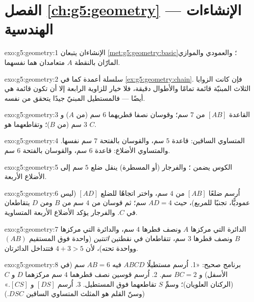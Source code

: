 \section*{الفصل \ref{ch:g5:geometry} --- الإنشاءات الهندسية}

\begin{solution}{exo:g5:geometry:1}
الإنشاءان يتبعان \cref{met:g5:geometry:basic}؛ والعمودي
والموازي المارّان بالنقطة $A$ متعامدان هما
نفسهما.
\end{solution}

\begin{solution}{exo:g5:geometry:2}
سلسلة أعمدة كما في \cref{ex:g5:geometry:chain}. فإن كانت
الزوايا الثلاث المبنيّة قائمة تمامًا والأطوال دقيقة، فلا
خيار للزاوية الرابعة إلا أن تكون قائمة هي أيضًا --- فالمستطيل
المبنيّ جيدًا يتحقق من نفسه.
\end{solution}

\begin{solution}{exo:g5:geometry:3}
القاعدة $[AB]$ من $7$ سم؛ وقوسان نصفا قطريهما $6$ سم (من $A$) و $3$ سم
(من $B$)؛ وتقاطعهما هو $C$.
\end{solution}

\begin{solution}{exo:g5:geometry:4}
المتساوي الساقين: قاعدة $5$ سم، والقوسان بالفتحة $7$ سم نفسها.
والمتساوي الأضلاع: قاعدة $6$ سم، والقوسان بالفتحة $6$ سم.
\end{solution}

\begin{solution}{exo:g5:geometry:5}
الكوس يضمن ؛ والفرجار (أو
المسطرة) ينقل ضلع $5$ سم إلى الأضلاع الأربعة.
\end{solution}

\begin{solution}{exo:g5:geometry:6}
اُرسم ضلعًا $[AB]$ من $4$ سم، واختر اتجاهًا للضلع $[AD]$ (ليس
عموديًّا، تجنبًا للمربع)، حيث $AD = 4$ سم؛ ثم قوسان من
$4$ سم من $B$ ومن $D$ يتقاطعان في $C$. والفرجار يؤكد
الأضلاع الأربعة المتساوية.
\end{solution}

\begin{solution}{exo:g5:geometry:7}
الدائرة التي مركزها $A$ ونصف قطرها $4$ سم، والدائرة التي مركزها
$B$ ونصف قطرها $3$ سم، تتقاطعان في نقطتين \emph{اثنتين} (واحدة فوق
المستقيم $(AB)$ وواحدة تحته)، لأن $4 + 3 > 5$ فتتداخل الدائرتان.
\end{solution}

\begin{solution}{exo:g5:geometry:8}
برنامج صحيح: «1. اُرسم مستطيلًا $ABCD$ فيه $AB = 6$ سم
(في الأسفل) و $BC = 2$ سم. 2. اُرسم قوسين نصف قطرهما $4$ سم مركزهما
$D$ و $C$ (الركنان العلويان)؛ وسمِّ $S$ تقاطعهما فوق
المستطيل. 3. اُرسم $[DS]$ و $[CS]$.» (وسنّ القلم
هو المثلث المتساوي الساقين $DSC$.)
\end{solution}

